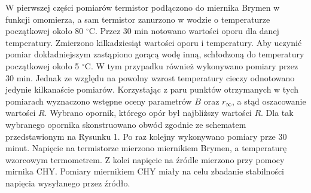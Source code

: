 \documentclass[10pt,a4paper]{article}
\begin{document}
W pierwszej części pomiarów termistor podłączono do miernika Brymen w funkcji omomierza, a sam termistor zanurzono w wodzie o temperaturze początkowej około 80 $^{\circ}$C. Przez 30 min notowano wartości oporu dla danej temperatury. Zmierzono kilkadziesiąt wartości oporu i temperatury. Aby uczynić pomiar dokładniejszym zastąpiono gorącą wodę inną, schłodzoną do temperatury początkowej około 5 $^{\circ}$C. W tym przypadku również wykonywano pomiary przez 30 min. Jednak ze względu na powolny wzrost temperatury cieczy odnotowano jedynie kilkanaście pomiarów. Korzystając z paru punktów otrzymanych w tych pomiarach wyznaczono wstępne oceny parametrów $B$ oraz $r_{\infty}$, a stąd oszacowanie wartości $R$. Wybrano opornik, którego opór był najbliższy wartości $R$. Dla tak wybranego opornika skonstruowano obwód zgodnie ze schematem przedstawionym na Rysunku 1. Po raz kolejny wykonywano pomiary prze 30 minut. Napięcie na termistorze mierzono miernikiem Brymen, a temperaturę wzorcowym termometrem. Z kolei napięcie na źródle mierzono przy pomocy mirnika CHY. Pomiary miernikiem CHY miały na celu zbadanie stabilności napięcia wysyłanego przez źródło. 
\end{document}
